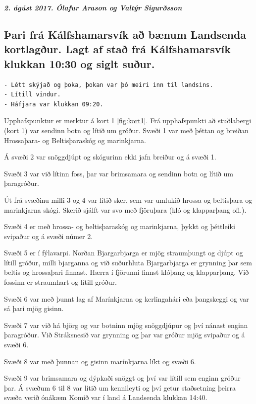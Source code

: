 \documentclass[icelandic,]{book}
\begin{document}
\textbf{\emph{2. ágúst 2017. Ólafur Arason og Valtýr Sigurðsson}}

\hypertarget{ari-fra-kalfshamarsvik-a-bnum-landsenda-kortlagur.-lagt-af-sta-fra-kalfshamarsvik-klukkan-1030-og-siglt-suur.}{%
\subsection{Þari frá Kálfshamarsvík að bænum Landsenda kortlagður. Lagt af stað frá Kálfshamarsvík klukkan 10:30 og siglt suður.}\label{ari-fra-kalfshamarsvik-a-bnum-landsenda-kortlagur.-lagt-af-sta-fra-kalfshamarsvik-klukkan-1030-og-siglt-suur.}}

\begin{verbatim}
- Létt skýjað og þoka, þokan var þó meiri inn til landsins.
- Lítill vindur.
- Háfjara var klukkan 09:20.
\end{verbatim}

Upphafspunktur er merktur á kort 1 \ref{fig:kort1}. Frá upphafspunkti að stuðlabergi (kort 1) var sendinn botn og lítið um gróður. Svæði 1 var með þéttan og breiðan Hrossaþara- og Beltisþaraskóg og marinkjarna.

Á svæði 2 var snöggdjúpt og skógurinn ekki jafn breiður og á svæði 1.

Svæði 3 var við lítinn foss, þar var brimsamara og sendinn botn og lítið um þaragróður.

Út frá svæðinu milli 3 og 4 var lítið sker, sem var umlukið hrossa og beltisþara og marinkjarna skógi. Skerið sjálft var svo með fjöruþara (kló og klapparþang ofl.).

Svæði 4 er með hrossa- og beltisþaraskóg og marinkjarna, þykkt og þéttleiki svipaður og á svæði númer 2.

Svæði 5 er í fýlavarpi. Norðan Bjargarbjarga er mjög straumþungt og djúpt og lítill gróður, milli bjarganna og við suðurhluta Bjargarbjarga er grynning þar sem beltis og hrossaþari finnast. Hærra í fjörunni finnst klóþang og klapparþang. Við fossinn er straumhart og lítill gróður.

Svæði 6 var með þunnt lag af Marínkjarna og kerlingahári eða þangskeggi og var sá þari mjög gisinn.

Svæði 7 var við há björg og var botninn mjög snöggdjúpur og því nánast enginn þaragróður. Við Stráksnesið var grynning og þar var gróður mjög svipaður og á svæði 6.

Svæði 8 var með þunnan og gisinn marínkjarna líkt og svæði 6.

Svæði 9 var brimsamara og dýpkaði snöggt og því var lítill sem enginn gróður þar. Á svæðum 6 til 8 var lítið um kennileyti og því getur staðsetning þeirra svæða verið ónákæm Komið var í land á Landsenda klukkan 14:40.
\end{document}
